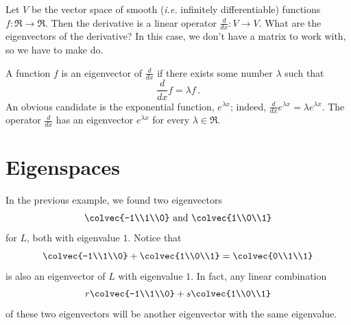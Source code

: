 \begin{example}
Let $V$ be the vector space of smooth (\textit{i.e.} infinitely differentiable) functions $f \colon \Re\rightarrow \Re$.  Then the derivative is a linear operator $\frac{d}{dx} \colon V\rightarrow V$.  What are the eigenvectors of the derivative?  In this case, we don't have a matrix to work with, so we have to make do.

A function $f$ is an eigenvector of $\frac{d}{dx}$ if there exists some number $\lambda$ such that $$\frac{d}{dx}f=\lambda f\, .$$  An obvious candidate is the exponential function, $e^{\lambda x}$; indeed, $\frac{d}{dx} e^{\lambda x} = \lambda e^{\lambda x}$.
The operator $\frac{d}{dx}$ has an eigenvector $e^{\lambda x}$ for every $\lambda \in \Re$.
\end{example}


\section{Eigenspaces}
In the previous example, we found two eigenvectors  $$\colvec{-1\\1\\0} \mbox{ and }\colvec{1\\0\\1}$$ for $L$, both with eigenvalue $1$.  Notice that  $$\colvec{-1\\1\\0} + \colvec{1\\0\\1}=
\colvec{0\\1\\1}$$ is also an eigenvector of $L$ with eigenvalue $1$.  In fact, any linear combination $$r\colvec{-1\\1\\0} + s\colvec{1\\0\\1}$$ of these two eigenvectors will be another eigenvector with the same eigenvalue.  

